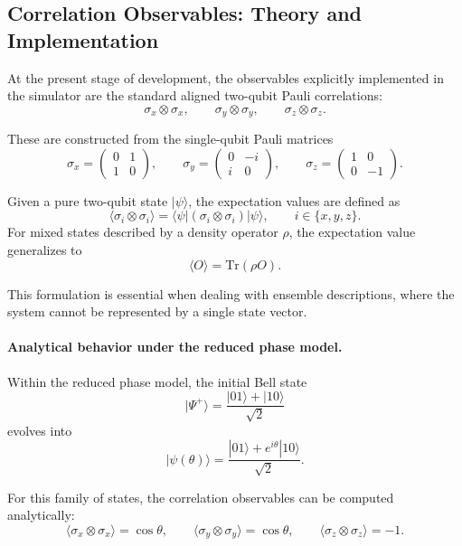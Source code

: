 \documentclass[a4paper]{article}
\begin{document}

\subsection{Correlation Observables: Theory and Implementation}

At the present stage of development, the observables explicitly implemented in the simulator are the standard aligned two-qubit Pauli correlations:
\[
\sigma_x \otimes \sigma_x,\qquad
\sigma_y \otimes \sigma_y,\qquad
\sigma_z \otimes \sigma_z.
\]

These are constructed from the single-qubit Pauli matrices
\[
\sigma_x=
\begin{pmatrix}
0 & 1\\
1 & 0
\end{pmatrix},
\qquad
\sigma_y=
\begin{pmatrix}
0 & -i\\
i & 0
\end{pmatrix},
\qquad
\sigma_z=
\begin{pmatrix}
1 & 0\\
0 & -1
\end{pmatrix}.
\]

Given a pure two-qubit state \( |\psi\rangle \), the expectation values are defined as
\[
\langle \sigma_i \otimes \sigma_i \rangle
=
\langle \psi|
(\sigma_i \otimes \sigma_i)
|\psi\rangle,
\qquad i\in\{x,y,z\}.
\]
For mixed states described by a density operator \(\rho\), the expectation value generalizes to
\[
\langle O \rangle = \mathrm{Tr}(\rho O).
\]

This formulation is essential when dealing with ensemble descriptions, where the system cannot be represented by a single state vector.

\paragraph{Analytical behavior under the reduced phase model.}

Within the reduced phase model, the initial Bell state
\[
|\Psi^+\rangle = \frac{|01\rangle + |10\rangle}{\sqrt{2}}
\]
evolves into
\[
|\psi(\theta)\rangle
=
\frac{|01\rangle + e^{i\theta}|10\rangle}{\sqrt{2}}.
\]

For this family of states, the correlation observables can be computed analytically:
\[
\langle \sigma_x \otimes \sigma_x \rangle = \cos\theta,
\qquad
\langle \sigma_y \otimes \sigma_y \rangle = \cos\theta,
\qquad
\langle \sigma_z \otimes \sigma_z \rangle = -1.
\]
\end{document}
